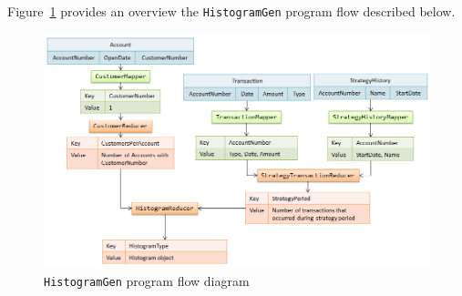Figure~\ref{fig:histogen} provides an overview the \texttt{HistogramGen} program flow described below.

\begin{figure}[hc]
 \centering
 \includegraphics[scale=0.60]{../images/HistogramGen.png}
  \caption{\texttt{HistogramGen} program flow diagram}
  \label{fig:histogen}
\end{figure}

